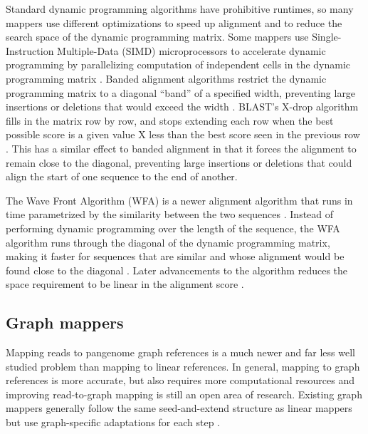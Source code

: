 \documentclass[11pt]{ucscthesis}
\begin{document}
Standard dynamic programming algorithms have prohibitive runtimes, so many mappers use different optimizations to speed up alignment and to reduce the search space of the dynamic programming matrix.
Some mappers use Single-Instruction Multiple-Data (SIMD) microprocessors to accelerate dynamic programming by parallelizing computation of independent cells in the dynamic programming matrix \cite{farrar_striped_2007,rognes_six-fold_2000}.
Banded alignment algorithms restrict the dynamic programming matrix to a diagonal ``band'' of a specified width, preventing large insertions or deletions that would exceed the width \cite{chao_aligning_1992}.
BLAST's X-drop algorithm fills in the matrix row by row, and stops extending each row when the best possible score is a given value X less than the best score seen in the previous row \cite{altschul_blast_1990}.
This has a similar effect to banded alignment in that it forces the alignment to remain close to the diagonal, preventing large insertions or deletions that could align the start of one sequence to the end of another.

The Wave Front Algorithm (WFA) is a newer alignment algorithm that runs in time parametrized by the similarity between the two sequences \cite{marco-sola_fast_wfa_2021}.
Instead of performing dynamic programming over the length of the sequence, the WFA algorithm runs through the diagonal of the dynamic programming matrix, making it faster for sequences that are similar and whose alignment would be found close to the diagonal \cite{marco-sola_fast_wfa_2021}.
Later advancements to the algorithm reduces the space requirement to be linear in the alignment score \cite{eizenga_wfa_2022}.


\subsection{Graph mappers}
\label{sec:graph-mappers}

Mapping reads to pangenome graph references is a much newer and far less well studied problem than mapping to linear references.
In general, mapping to graph references is more accurate, but also requires more computational resources and improving read-to-graph mapping is still an open area of research.
Existing graph mappers generally follow the same seed-and-extend structure as linear mappers but use graph-specific adaptations for each step \cite{eizenga_pangenome_2020, baaijens_computational_2022}.
\end{document}
